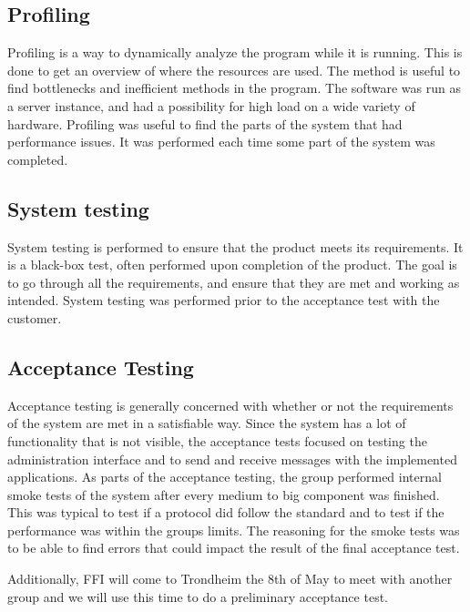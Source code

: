 \subsection{Profiling}
\label{subsec:testing-test_description-profiling}

Profiling is a way to dynamically analyze the program while it is running. This is done to get an overview of where the resources are used. The method is useful to find bottlenecks and inefficient methods in the program. The software was run as a server instance, and had a possibility for high load on a wide variety of hardware. Profiling was useful to find the parts of the system that had performance issues. It was performed each time some part of the system was completed.

\subsection{System testing}
\label{subsec:testing-test_description-system_testing}

System testing is performed to ensure that the product meets its requirements. It is a black-box test, often performed upon completion of the product. The goal is to go through all the requirements, and ensure that they are met and working as intended. System testing was performed prior to the acceptance test with the customer.

\subsection{Acceptance Testing}
\label{subsec:testing-test_description-acceptance_testing}
Acceptance testing is generally concerned with whether or not the requirements of the system are met in a satisfiable way. Since the system has a lot of functionality that is not visible, the acceptance tests focused on testing the administration interface and to send and receive messages with the implemented applications.
As parts of the acceptance testing, the group performed internal smoke tests of the system after every medium to big component was finished. This was typical to test if a protocol did follow the standard and to test if the performance was within the groups limits. The reasoning for the smoke tests was to be able to find errors that could impact the result of the final acceptance test.

Additionally, FFI will come to Trondheim the 8th of May to meet with another group and we will use this time to do a preliminary acceptance test.

